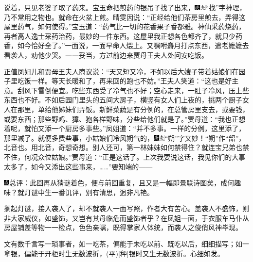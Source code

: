说着，只见老婆子取了药来。宝玉命把煎药的银吊子找了出来，{\includegraphics[width=3mm]{../Images/00004}\includegraphics[width=3mm]{../Images/00012}\footnotesize \kaishu ``找''字神理，乃不常用之物也。}就命在火盆上煎。晴雯因说：``正经给他们茶房里煎去，弄得这屋里药气，如何使得。''宝玉道：``药气比一切的花香果子香都雅。神仙采药烧药，再者高人逸士采药治药，最妙的一件东西。这屋里我正想各色都齐了，就只少药香，如今恰好全了。''一面说，一面早命人煨上。又嘱咐麝月打点东西，遣老嬷嬷去看袭人，劝他少哭。一一妥当，方过前边来贾母王夫人处问安吃饭。

正值凤姐儿和贾母王夫人商议说：``天又短又冷，不如以后大嫂子带着姑娘们在园子里吃饭一样。等天长暖和了，再来回的跑也不妨。''王夫人笑道：``这也是好主意。刮风下雪倒便宜。吃些东西受了冷气也不好；空心走来，一肚子冷风，压上些东西也不好。不如后园门里头的五间大房子，横竖有女人们上夜的，挑两个厨子女人在那里，单给他姊妹们弄饭。新鲜菜蔬是有分例的，在总管房里支去，或要钱，或要东西；那些野鸡、獐、狍各样野味，分些给他们就是了。''贾母道：``我也正想着呢，就怕又添一个厨房多事些。''凤姐道：``并不多事。一样的分例，这里添了，那里减了。就便多费些事，小姑娘们冷风朔气的，{\includegraphics[width=3mm]{../Images/00004}\includegraphics[width=3mm]{../Images/00012}\footnotesize \kaishu ``朔''字又妙！``朔''作``韶''，北音也。用北音，奇想奇想。}别人还可，第一林妹妹如何禁得住？就连宝兄弟也禁不住，何况众位姑娘。''贾母道：``正是这话了。上次我要说这话，我见你们的大事太多了，如今又添出这些事来，\ldots{}\ldots{}''要知端的------

{\includegraphics[width=3mm]{../Images/00005}总评：此回再从猜谜着色，便与前回重复，且又是一幅即景联诗图矣，成何趣味？就灯谜中生一番讥评，别有清思，迥非凡艳。}

{搁起灯谜，接入袭人了，却不就袭人一面写照，作者大有苦心。盖袭人不盛饰，则非大家威仪，如盛饰，又岂有其母临危而盛饰者乎？在凤姐一面，于衣服车马仆从房屋铺盖等物一一检点，色色亲嘱，既得掌家人体统，而袭人之俊俏风神毕现。}

{文有数千言写一琐事者，如一吃茶，偏能于未吃以前、既吃以后，细细描写；如一拿银，偏能于开柜时生无数波折，{{(平)}}{[}秤{]}银时又生无数波折。心细如发。}
